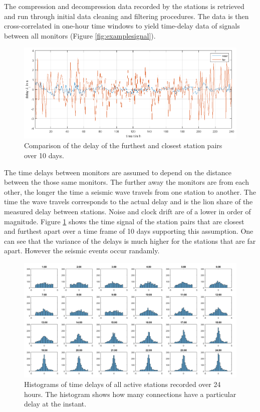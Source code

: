 \documentclass[12pt, sumlimits, intlimits]{article}
\begin{document}
The compression and decompression data recorded by the stations is retrieved and run through initial data cleaning and filtering procedures. The data is then cross-correlated in one-hour time windows to yield time-delay data of signals between all monitors (Figure \ref{fig:examplesignal}). 

\begin{figure}[!ht]
	\begin{center}   
		\includegraphics[width=\textwidth]{../figures/Comparisondelayoverrandomdayoffarestandclosestlinks.png}
	\end{center}
	\caption{Comparison of the delay of the furthest and closest station pairs over 10 days.}\label{fig:nearfar}
\end{figure}

The time delays between monitors are assumed to depend on the distance between the those same monitors. The further away the monitors are from each other, the longer the time a seismic wave travels from one station to  another. The time the wave travels corresponds to the actual delay and is the lion share of the measured delay between stations. Noise and clock drift are of a lower in order of magnitude. Figure \ref{fig:nearfar} shows the time signal of the station pairs that are closest and furthest apart over a time frame of 10 days supporting this assumption. One can see that the variance of the delays is much higher for the stations that are far apart. However the seismic events occur randamly.

\begin{figure}[ht]
	\begin{center}   
		\includegraphics[width=\textwidth]{../figures/hourlydelaydistributionoverallstationsforoneday.png}
	\end{center}
	\caption{Histograms of time delays of all active stations recorded over 24 hours. The histogram shows how many connections have a particular delay at the instant.}\label{fig:histograms}
\end{figure}
\end{document}
